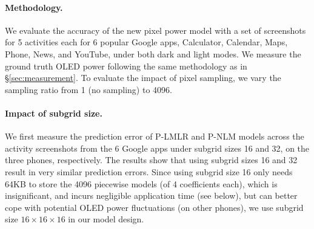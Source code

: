 \paragraph{Methodology.}
We evaluate the accuracy of the new pixel power model with a set of screenshots
 for 5 activities each for 6 popular Google apps,
Calculator, Calendar, Maps, Phone, News, and YouTube,
under both dark and light modes.
We measure the ground truth OLED power
following the same methodology as in \S\ref{sec:measurement}.
To evaluate the impact of pixel sampling, we vary the sampling ratio
from 1 (no sampling) to 4096.



\paragraph{Impact of subgrid size.}
We first measure the prediction error of P-LMLR and P-NLM models across
the activity screenshots from the 6 Google apps
under subgrid sizes 16 and 32, on the three phones, respectively.
The results show that using subgrid sizes 16 and 32 result in very similar
prediction errors.  Since using subgrid size
16 only needs 64KB 
to store the 4096 piecewise models (of 4 coefficients each),
which is insignificant, and incurs
negligible application time (see below),
but can better cope with potential OLED power fluctuations (\eg on other phones),
we use subgrid size $16\times 16\times 16$ in our model design.

